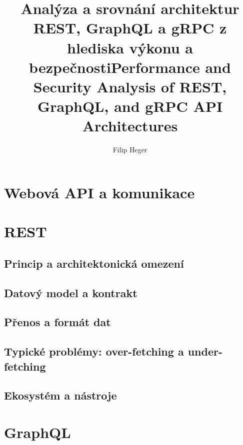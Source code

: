 \documentclass[
  program=itk,
  biblatex,
  language=czech,
  figures=false,
  glossaries,
  index
]{kidiplom}
\title{Analýza a srovnání architektur REST, GraphQL a gRPC z hlediska výkonu a bezpečnosti}
\title[english]{Performance and Security Analysis of REST, GraphQL, and gRPC API Architectures}
\author{Filip Heger}
\begin{document}
\maketitle



\newcommand{\BibLaTeX}{\textsc{Bib}\LaTeX}


\section{Webová API a komunikace}
\section{REST}
 \subsection{Princip a architektonická omezení}
 \subsection{Datový model a kontrakt}
 \subsection{Přenos a formát dat}
 \subsection{Typické problémy: over-fetching a under-fetching}
 \subsection{Ekosystém a nástroje}
\section{GraphQL}
\end{document}
